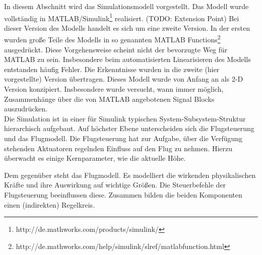 In diesem Abschnitt wird das Simulationsmodell vorgestellt. Das Modell wurde vollständig in MATLAB/Simulink\footnote{http://de.mathworks.com/products/simulink/} realisiert. (TODO: Extension Point) Bei dieser Version des Modells handelt es sich um eine zweite Version. In der ersten wurden große Teile des Modells in so genannten MATLAB Functions\footnote{http://de.mathworks.com/help/simulink/slref/matlabfunction.html} ausgedrückt. Diese Vorgehensweise scheint nicht der bevorzugte Weg für MATLAB zu sein. Insbesondere beim automatisierten Linearisieren des Modells entstanden häufig Fehler. Die Erkenntnisse wurden in die zweite (hier vorgestellte) Version übertragen. Dieses Modell wurde von Anfang an als 2-D Version konzipiert. Insbesondere wurde versucht, wann immer möglich, Zusammenhänge über die von MATLAB angebotenen Signal Blocks auszudrücken.\\

Die Simulation ist in einer für Simulink typischen System-Subsystem-Struktur hierarchisch aufgebaut. Auf höchster Ebene unterscheiden sich die Flugsteuerung und das Flugmodell. Die Flugsteuerung hat zur Aufgabe, über die Verfügung stehenden Aktuatoren regelnden Einfluss auf den Flug zu nehmen. Hierzu überwacht es einige Kernparameter, wie die aktuelle Höhe.

Dem gegenüber steht das Flugmodell. Es modelliert die wirkenden physikalischen Kräfte und ihre Auswirkung auf wichtige Größen. Die Steuerbefehle der Flugsteuerung beeinflussen diese. Zusammen bilden die beiden Komponenten einen (indirekten) Regelkreis.